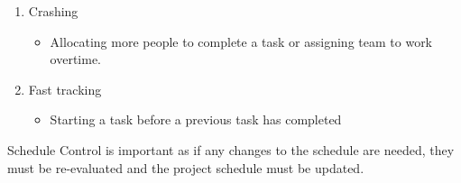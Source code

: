 \begin{enumerate}
\item Crashing 
\begin{itemize}
\item Allocating more people to complete a task or assigning team to work overtime.
\end{itemize}
\item Fast tracking
\begin{itemize}
\item Starting a task before a previous task has completed
\end{itemize}
\end{enumerate}

Schedule Control is important as if any changes to the schedule are needed, they must be re-evaluated and the project schedule must be updated.  
